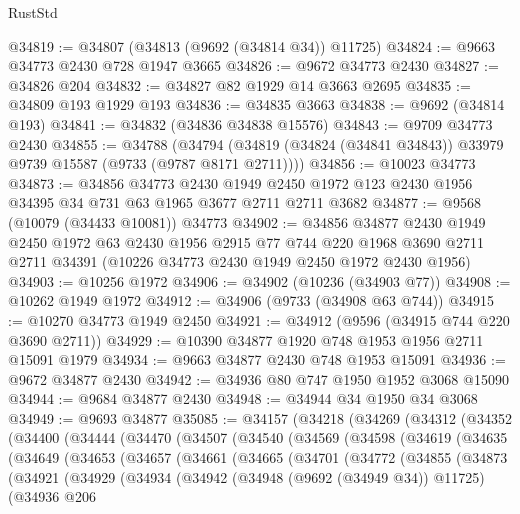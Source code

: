 \begin{lexlean}{RustStd}
\begin{coremodule}
@34819 := @34807 (@34813 (@9692 (@34814 @34)) @11725)
@34824 := @9663 @34773 @2430 @728 @1947 @3665
@34826 := @9672 @34773 @2430
@34827 := @34826 @204
@34832 := @34827 @82 @1929 @14 @3663 @2695
@34835 := @34809 @193 @1929 @193
@34836 := @34835 @3663
@34838 := @9692 (@34814 @193)
@34841 := @34832 (@34836 @34838 @15576)
@34843 := @9709 @34773 @2430
@34855 := @34788
    (@34794 (@34819 (@34824 (@34841 @34843)) @33979 @9739 @15587 (@9733 (@9787 @8171 @2711))))
@34856 := @10023 @34773
@34873 := @34856
    @34773
    @2430
    @1949
    @2450
    @1972
    @123
    @2430
    @1956
    @34395
    @34
    @731
    @63
    @1965
    @3677
    @2711
    @2711
    @3682
@34877 := @9568 (@10079 (@34433 @10081)) @34773
@34902 := @34856
    @34877
    @2430
    @1949
    @2450
    @1972
    @63
    @2430
    @1956
    @2915
    @77
    @744
    @220
    @1968
    @3690
    @2711
    @2711
    @34391
    (@10226 @34773 @2430 @1949 @2450 @1972 @2430 @1956)
@34903 := @10256 @1972
@34906 := @34902 (@10236 (@34903 @77))
@34908 := @10262 @1949 @1972
@34912 := @34906 (@9733 (@34908 @63 @744))
@34915 := @10270 @34773 @1949 @2450
@34921 := @34912 (@9596 (@34915 @744 @220 @3690 @2711))
@34929 := @10390 @34877 @1920 @748 @1953 @1956 @2711 @15091 @1979
@34934 := @9663 @34877 @2430 @748 @1953 @15091
@34936 := @9672 @34877 @2430
@34942 := @34936 @80 @747 @1950 @1952 @3068 @15090
@34944 := @9684 @34877 @2430
@34948 := @34944 @34 @1950 @34 @3068
@34949 := @9693 @34877
@35085 := @34157
    (@34218
      (@34269
        (@34312
          (@34352
            (@34400
              (@34444
                (@34470
                  (@34507
                    (@34540
                      (@34569
                        (@34598
                          (@34619
                            (@34635
                              (@34649
                                (@34653
                                  (@34657
                                    (@34661
                                      (@34665
                                        (@34701
                                          (@34772
                                            (@34855
                                              (@34873
                                                (@34921
                                                  (@34929
                                                    (@34934
                                                      (@34942
                                                        (@34948 (@9692 (@34949 @34)) @11725)
                                                        (@34936
                                                          @206

\end{coremodule}
\end{lexlean}
